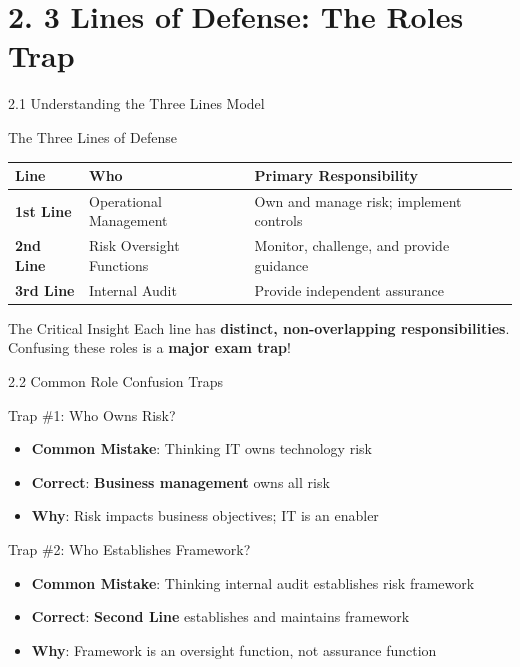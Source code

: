 \documentclass{beamer}
\begin{document}
	\section{2. 3 Lines of Defense: The Roles Trap}
	
	\begin{frame}{2.1 Understanding the Three Lines Model}
		\begin{block}{The Three Lines of Defense}
			\begin{tabular}{|p{3cm}|p{4cm}|p{4cm}|}
				\hline
				\textbf{Line} & \textbf{Who} & \textbf{Primary Responsibility} \\
				\hline
				\textbf{1st Line} & Operational Management & Own and manage risk; implement controls \\
				\hline
				\textbf{2nd Line} & Risk Oversight Functions & Monitor, challenge, and provide guidance \\
				\hline
				\textbf{3rd Line} & Internal Audit & Provide independent assurance \\
				\hline
			\end{tabular}
		\end{block}
		
		\begin{alertblock}{The Critical Insight}
			Each line has \textbf{distinct, non-overlapping responsibilities}. Confusing these roles is a \textbf{major exam trap}!
		\end{alertblock}
	\end{frame}
	
	\begin{frame}{2.2 Common Role Confusion Traps}
		\begin{block}{Trap \#1: Who Owns Risk?}
			\begin{itemize}
				\item \textbf{Common Mistake}: Thinking IT owns technology risk
				\item \textbf{Correct}: \textbf{Business management} owns all risk
				\item \textbf{Why}: Risk impacts business objectives; IT is an enabler
			\end{itemize}
		\end{block}
		
		\begin{block}{Trap \#2: Who Establishes Framework?}
			\begin{itemize}
				\item \textbf{Common Mistake}: Thinking internal audit establishes risk framework
				\item \textbf{Correct}: \textbf{Second Line} establishes and maintains framework
				\item \textbf{Why}: Framework is an oversight function, not assurance function
			\end{itemize}
		\end{block}
	\end{frame}
	
\end{document}
